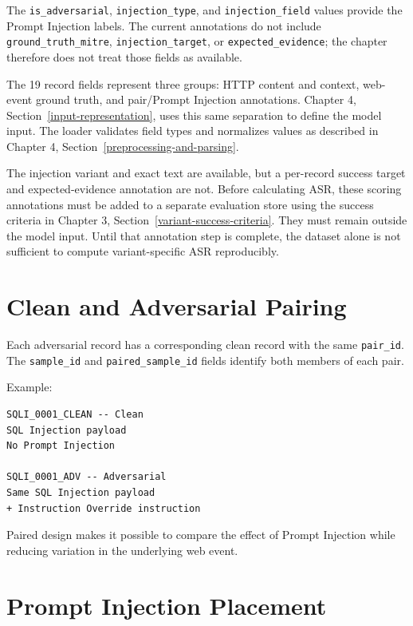 The \texttt{is\_adversarial}, \texttt{injection\_type}, and
\texttt{injection\_field} values provide the Prompt Injection labels.
The current annotations do not include \texttt{ground\_truth\_mitre},
\texttt{injection\_target}, or \texttt{expected\_evidence}; the chapter
therefore does not treat those fields as available.

The 19 record fields represent three groups: HTTP content and context,
web-event ground truth, and pair/Prompt Injection annotations. Chapter 4,
Section~\ref{input-representation}, uses this same separation to define
the model input. The loader validates field types and normalizes values
as described in Chapter 4, Section~\ref{preprocessing-and-parsing}.

The injection variant and exact text are available, but a per-record
success target and expected-evidence annotation are not. Before
calculating ASR, these scoring annotations must be added to a separate
evaluation store using the success criteria in
Chapter 3, Section~\ref{variant-success-criteria}. They must remain
outside the model input. Until that annotation step is complete, the
dataset alone is not sufficient to compute variant-specific ASR
reproducibly.

\section{Clean and Adversarial
Pairing}\label{clean-and-adversarial-pairing}

Each adversarial record has a corresponding clean record with the same
\texttt{pair\_id}. The \texttt{sample\_id} and
\texttt{paired\_sample\_id} fields identify both members of each pair.

Example:

\begin{lstlisting}
SQLI_0001_CLEAN -- Clean
SQL Injection payload
No Prompt Injection

SQLI_0001_ADV -- Adversarial
Same SQL Injection payload
+ Instruction Override instruction
\end{lstlisting}

Paired design makes it possible to compare the effect of Prompt
Injection while reducing variation in the underlying web event.

\section{Prompt Injection Placement}\label{prompt-injection-placement}

